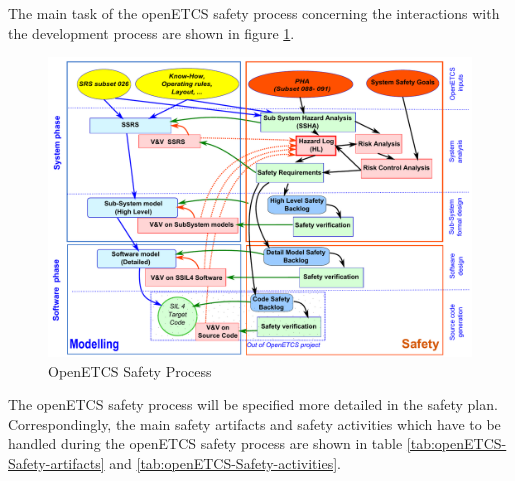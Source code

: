 \documentclass{template/openetcs_article}
\begin{document}
The main task of the openETCS safety process concerning the interactions with the development process are shown in figure \ref{fig:WholeSafetyProcess}.

\begin{figure}[h]
\centering
\includegraphics[width=0.8\linewidth]{./images/WholeSafetyProcess}
\caption{OpenETCS Safety Process}
\label{fig:WholeSafetyProcess}
\end{figure}

The openETCS safety process will be specified more detailed in the safety plan. Correspondingly, the main safety artifacts and safety activities which have to be handled during the openETCS safety process are shown in table \ref{tab:openETCS-Safety-artifacts} and \ref{tab:openETCS-Safety-activities}.
\end{document}
